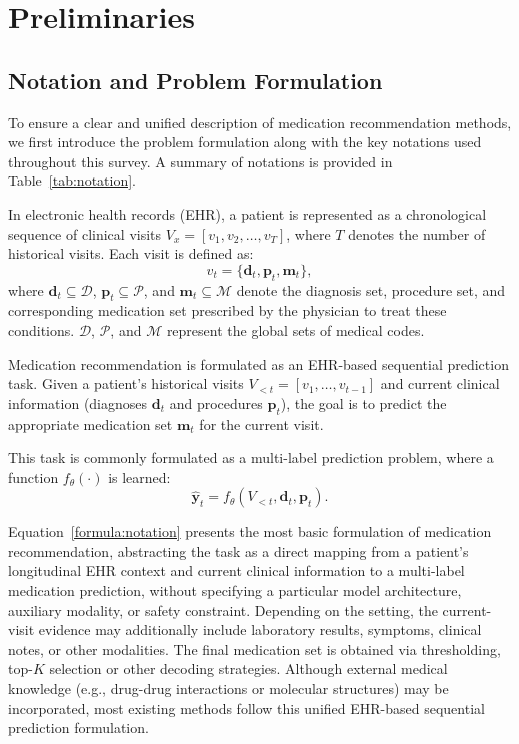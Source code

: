 \documentclass[manuscript,review]{acmart}
\begin{document}
\section{Preliminaries}
\label{sec:preliminaries}

\subsection{Notation and Problem Formulation} \label{Notation Definition}

To ensure a clear and unified description of medication recommendation methods, we first introduce the problem formulation along with the key notations used throughout this survey. A summary of notations is provided in Table~\ref{tab:notation}.

In electronic health records (EHR), a patient is represented as a chronological sequence of clinical visits $V_x = [v_1, v_2, \dots, v_T]$, where $T$ denotes the number of historical visits. Each visit is defined as:
\begin{equation}
v_t = \{\mathbf{d}_t, \mathbf{p}_t, \mathbf{m}_t\},
\end{equation}
where $\mathbf{d}_t \subseteq \mathcal{D}$, $\mathbf{p}_t \subseteq \mathcal{P}$, and $\mathbf{m}_t \subseteq \mathcal{M}$ denote the diagnosis set, procedure set, and corresponding medication set prescribed by the physician to treat these conditions. $\mathcal{D}$, $\mathcal{P}$, and $\mathcal{M}$ represent the global sets of medical codes.

Medication recommendation is formulated as an EHR-based sequential prediction task. Given a patient’s historical visits $V_{<t} = [v_1, \dots, v_{t-1}]$ and current clinical information (diagnoses $\mathbf{d}_t$ and procedures $\mathbf{p}_t$), the goal is to predict the appropriate medication set $\mathbf{m}_t$ for the current visit.

This task is commonly formulated as a multi-label prediction problem, where a function $f_\theta(\cdot)$ is learned:
\begin{equation}
\hat{\mathbf{y}}_t = f_\theta(V_{<t}, \mathbf{d}_t, \mathbf{p}_t).
\label{formula:notation}
\end{equation}

Equation~\ref{formula:notation} presents the most basic formulation of medication recommendation, abstracting the task as a direct mapping from a patient's longitudinal EHR context and current clinical information to a multi-label medication prediction, without specifying a particular model architecture, auxiliary modality, or safety constraint. Depending on the setting, the current-visit evidence may additionally include laboratory results, symptoms, clinical notes, or other modalities. 
The final medication set is obtained via thresholding, top-$K$ selection or other decoding strategies. Although external medical knowledge (e.g., drug-drug interactions or molecular structures) may be incorporated, most existing methods follow this unified EHR-based sequential prediction formulation.
\end{document}
